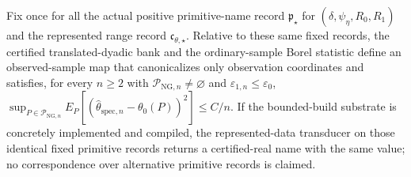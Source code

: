 Fix once for all the actual positive primitive-name record \(\mathfrak p_{\star}\) for \((\delta,\psi_{\eta},R_0,R_1)\) and the represented range record \(\mathfrak c_{\theta,\star}\). Relative to these same fixed records, the certified translated-dyadic bank and the ordinary-sample Borel statistic define an observed-sample map that canonicalizes only observation coordinates and satisfies, for every \(n\ge2\) with \(\mathcal P_{\mathrm{NG},n}\neq\varnothing\) and \(\varepsilon_{1,n}\le\varepsilon_0\), \(\sup_{P\in\mathcal P_{\mathrm{NG},n}}E_P[(\widehat\theta_{\mathrm{spec},n}-\theta_0(P))^2]\le C/n\). If the bounded-build substrate is concretely implemented and compiled, the represented-data transducer on those identical fixed primitive records returns a certified-real name with the same value; no correspondence over alternative primitive records is claimed.